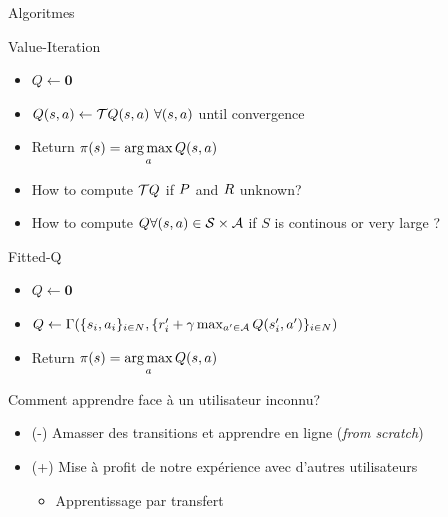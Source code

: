 \documentclass[french,handout]{beamer}
\begin{document}
    \begin{frame}{Algoritmes}

        \begin{block}{Value-Iteration}
            \begin{itemize}
                \item $Q \leftarrow \mathbf{0}$
                \item $Q(s,a) \leftarrow \mathcal{T} Q(s,a)\ \forall (s,a)$ until convergence
                \item Return $\pi(s) = \operatorname*{arg\,max}\limits_{a} Q(s,a)$
            \end{itemize}
        \end{block}

        \begin{alertblock}{}
            \begin{itemize}
                \item How to compute $\mathcal{T} Q$ if $P$ and $R$ unknown?
                \item How to compute $Q \forall (s,a) \in \mathcal{S}\times\mathcal{A}$ if $S$ is continous or very large ?
            \end{itemize}

        \end{alertblock}

        \begin{block}{Fitted-Q}
            \begin{itemize}
                \item $Q \leftarrow \mathbf{0}$
                \item $Q \leftarrow \Gamma(\{s_{i},a_{i}\}_{{i}\in N},\{r'_{i} + \gamma  \max_{a'\in\mathcal{A}} Q(s'_i,a')\}_{{i} \in N})$
                \item Return $\pi(s) = \operatorname*{arg\,max}\limits_{a} Q(s,a)$
            \end{itemize}
        \end{block}


    \end{frame}

    \begin{frame}{}


        \begin{alertblock}{}
            Comment apprendre face à un utilisateur inconnu?
        \end{alertblock}


        \begin{itemize}
            \item (-) Amasser des transitions et apprendre en ligne (\textit{from scratch})
            \item (+) Mise à profit de notre expérience avec d'autres utilisateurs
            \begin{itemize}
                \item Apprentissage par transfert
            \end{itemize}

        \end{itemize}


    \end{frame}
\end{document}
